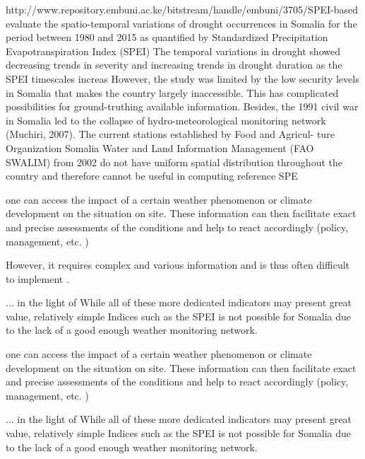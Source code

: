 http://www.repository.embuni.ac.ke/bitstream/handle/embuni/3705/SPEI-based%
evaluate the spatio-temporal variations of drought occurrences in Somalia for the period between 1980 and 2015 as quantified by Standardized Precipitation Evapotranspiration Index (SPEI)
The temporal variations in drought showed decreasing trends in severity and increasing trends in drought duration as the SPEI timescales increas
However, the study was limited by the low security levels in Somalia that makes
the country largely inaccessible. This has complicated possibilities for
ground-truthing available information. Besides, the 1991 civil war in
Somalia led to the collapse of hydro-meteorological monitoring network
(Muchiri, 2007). The current stations established by Food and Agricul-
ture Organization Somalia Water and Land Information Management
(FAO SWALIM) from 2002 do not have uniform spatial distribution
throughout the country and therefore cannot be useful in computing
reference SPE

one can access the impact of a certain weather phenomenon or climate development on the situation on site. These information can then facilitate exact and precise assessments of the conditions and help to react accordingly (policy, management, etc. ) 


However, it requires complex and various information and is thus often difficult to implement \autocite{liuWaterScarcityAssessments2017}.

... in the light of
While all of these more dedicated indicators may present great value, relatively simple Indices such as the SPEI is not possible for Somalia due to the lack of a good enough weather monitoring network. 

one can access the impact of a certain weather phenomenon or climate development on the situation on site. These information can then facilitate exact and precise assessments of the conditions and help to react accordingly (policy, management, etc. ) 


... in the light of
While all of these more dedicated indicators may present great value, relatively simple Indices such as the SPEI is not possible for Somalia due to the lack of a good enough weather monitoring network. 



